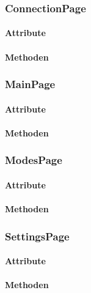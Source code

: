 \documentclass[../entwurf.tex]{subfiles}
\begin{document}
\subsubsection{ConnectionPage}
\paragraph{Attribute}
\paragraph{Methoden}
\subsubsection{MainPage}
\paragraph{Attribute}
\paragraph{Methoden}
\subsubsection{ModesPage}
\paragraph{Attribute}
\paragraph{Methoden}
\subsubsection{SettingsPage}
\paragraph{Attribute}
\paragraph{Methoden}
\end{document}
